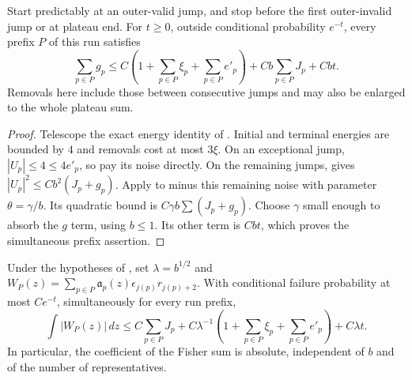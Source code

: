 \begin{lemma}
\label{lemma:paths-run-drift}
Start predictably at an outer-valid jump, and stop before the first
outer-invalid jump or at plateau end.  For $t\ge0$, outside conditional
probability $e^{-t}$, every prefix $P$ of this run satisfies
\begin{equation}
 \sum_{p\in P}g_p
 \le C\left(1+\sum_{p\in P}\xi_p+\sum_{p\in P}e'_p\right)
       +Cb\sum_{p\in P}J_p+Cb t.
 \label{eq:source-16}
\end{equation}
Removals here include those between consecutive jumps and may also be
enlarged to the whole plateau sum.
\end{lemma}

\begin{proof}
Telescope the exact energy identity of
.  Initial and terminal energies are bounded
by $4$ and removals cost at most $3\xi$.  On an exceptional jump,
$|U_p|\le4\le4e'_p$, so pay its noise directly.  On the remaining jumps,
 gives
$|U_p|^2\le Cb^2(J_p+g_p)$.  Apply  to minus this
remaining noise with parameter $\theta=\gamma/b$.  Its quadratic bound is
$C\gamma b\sum(J_p+g_p)$.  Choose $\gamma$ small enough to absorb the
$g$ term, using $b\le1$.  Its other term is $Cb t$, which proves the
simultaneous prefix assertion.
\end{proof}

\begin{lemma}
\label{lemma:paths-run-norm}
Under the hypotheses of , set
$\lambda=b^{1/2}$ and
$W_P(z)=\sum_{p\in P}\mathfrak a_p(z)\epsilon_{j(p)}r_{j(p)+2}$.  With conditional
failure probability at most $Ce^{-t}$, simultaneously for every run prefix,
\begin{equation}
 \int|W_P(z)|\,dz
 \le C\sum_{p\in P}J_p
      +C\lambda^{-1}\left(1+\sum_{p\in P}\xi_p+\sum_{p\in P}e'_p\right)
      +C\lambda t.
 \label{eq:source-17}
\end{equation}
In particular, the coefficient of the Fisher sum is absolute, independent
of $b$ and of the number of representatives.
\end{lemma}

